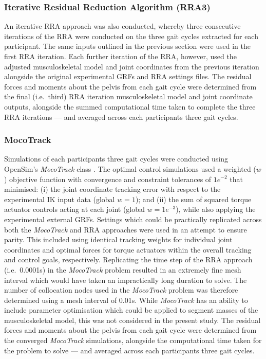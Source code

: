 \documentclass[]{elsarticle} %
\begin{document}
\hypertarget{iterative-residual-reduction-algorithm-rra3}{%
\subsubsection{Iterative Residual Reduction Algorithm
(RRA3)}\label{iterative-residual-reduction-algorithm-rra3}}

An iterative RRA approach \citep{Rajagopal2016} was also conducted,
whereby three consecutive iterations of the RRA were conducted on the
three gait cycles extracted for each participant. The same inputs
outlined in the previous section were used in the first RRA iteration.
Each further iteration of the RRA, however, used the adjusted
musculoskeletal model and joint coordinates from the previous iteration
alongside the original experimental GRFs and RRA settings files. The
residual forces and moments about the pelvis from each gait cycle were
determined from the final (i.e.~third) RRA iteration musculoskeletal
model and joint coordinate outputs, alongside the summed computational
time taken to complete the three RRA iterations --- and averaged across
each participants three gait cycles.

\hypertarget{mocotrack}{%
\subsubsection{MocoTrack}\label{mocotrack}}

Simulations of each participants three gait cycles were conducted using
OpenSim's \emph{MocoTrack} class \citep{Dembia2020}. The optimal control
simulations used a weighted (\(w\)) objective function with convergence
and constraint tolerances of \(1e^{-2}\) that minimised: (i) the joint
coordinate tracking error with respect to the experimental IK input data
(global \(w = 1\)); and (ii) the sum of squared torque actuator controls
acting at each joint (global \(w = 1e^{-3}\)), while also applying the
experimental external GRFs. Settings which could be practically
replicated across both the \emph{MocoTrack} and RRA approaches were used
in an attempt to ensure parity. This included using identical tracking
weights for individual joint coordinates and optimal forces for torque
actuators within the overall tracking and control goals, respectively.
Replicating the time step of the RRA approach (i.e.~0.0001s) in the
\emph{MocoTrack} problem resulted in an extremely fine mesh interval
which would have taken an impractically long duration to solve. The
number of collocation nodes used in the \emph{MocoTrack} problem was
therefore determined using a mesh interval of 0.01s. While
\emph{MocoTrack} has an ability to include parameter optimisation which
could be applied to segment masses of the musculoskeletal model, this
was not considered in the present study. The residual forces and moments
about the pelvis from each gait cycle were determined from the converged
\emph{MocoTrack} simulations, alongside the computational time taken for
the problem to solve --- and averaged across each participants three
gait cycles.
\end{document}
